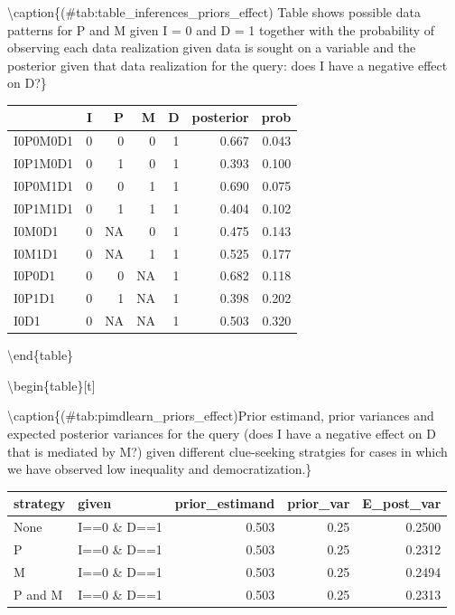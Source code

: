\documentclass[12pt,]{book}
\begin{document}
\textbackslash{}caption\{(\#tab:table\_inferences\_priors\_effect)\label{possible_outcomespimd_priors_effect} Table shows possible data patterns for P and M given I = 0 and D = 1 together with the probability of observing each data realization given data is sought on a variable and the posterior given that data realization for the query: does I have a negative effect on D?\}
\centering

\begin{tabular}{l|r|r|r|r|r|r}
\hline
  & I & P & M & D & posterior & prob\\
\hline
I0P0M0D1 & 0 & 0 & 0 & 1 & 0.667 & 0.043\\
\hline
I0P1M0D1 & 0 & 1 & 0 & 1 & 0.393 & 0.100\\
\hline
I0P0M1D1 & 0 & 0 & 1 & 1 & 0.690 & 0.075\\
\hline
I0P1M1D1 & 0 & 1 & 1 & 1 & 0.404 & 0.102\\
\hline
I0M0D1 & 0 & NA & 0 & 1 & 0.475 & 0.143\\
\hline
I0M1D1 & 0 & NA & 1 & 1 & 0.525 & 0.177\\
\hline
I0P0D1 & 0 & 0 & NA & 1 & 0.682 & 0.118\\
\hline
I0P1D1 & 0 & 1 & NA & 1 & 0.398 & 0.202\\
\hline
I0D1 & 0 & NA & NA & 1 & 0.503 & 0.320\\
\hline
\end{tabular}

\textbackslash{}end\{table\}

\textbackslash{}begin\{table\}{[}t{]}

\textbackslash{}caption\{(\#tab:pimdlearn\_priors\_effect)Prior estimand, prior variances and expected posterior variances for the query (does I have a negative effect on D that is mediated by M?) given different clue-seeking stratgies for cases in which we have observed low inequality and democratization.\}
\centering

\begin{tabular}{l|l|r|r|r}
\hline
strategy & given & prior\_estimand & prior\_var & E\_post\_var\\
\hline
None & I==0 \& D==1 & 0.503 & 0.25 & 0.2500\\
\hline
P & I==0 \& D==1 & 0.503 & 0.25 & 0.2312\\
\hline
M & I==0 \& D==1 & 0.503 & 0.25 & 0.2494\\
\hline
P and M & I==0 \& D==1 & 0.503 & 0.25 & 0.2313\\
\hline
\end{tabular}
\end{document}
